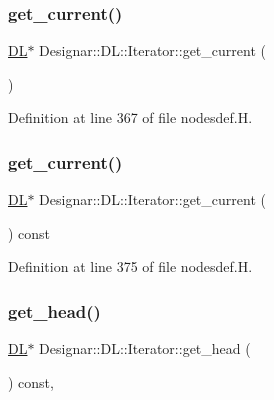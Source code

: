 \subsubsection{\texorpdfstring{get\+\_\+current()}{get\_current()}\hspace{0.1cm}{\footnotesize\ttfamily [1/2]}}
{\footnotesize\ttfamily \hyperlink{class_designar_1_1_d_l}{DL}$\ast$ Designar\+::\+D\+L\+::\+Iterator\+::get\+\_\+current (\begin{DoxyParamCaption}{ }\end{DoxyParamCaption})\hspace{0.3cm}{\ttfamily [inline]}}



Definition at line 367 of file nodesdef.\+H.

\mbox{\label{class_designar_1_1_d_l_1_1_iterator_aab4752b8c8f25cfbbd3560cebf23b7d1}} 
\subsubsection{\texorpdfstring{get\+\_\+current()}{get\_current()}\hspace{0.1cm}{\footnotesize\ttfamily [2/2]}}
{\footnotesize\ttfamily \hyperlink{class_designar_1_1_d_l}{DL}$\ast$ Designar\+::\+D\+L\+::\+Iterator\+::get\+\_\+current (\begin{DoxyParamCaption}{ }\end{DoxyParamCaption}) const\hspace{0.3cm}{\ttfamily [inline]}}



Definition at line 375 of file nodesdef.\+H.

\mbox{\label{class_designar_1_1_d_l_1_1_iterator_a575d5bbd0ce2e3d5df42d5d0112a1063}} 
\subsubsection{\texorpdfstring{get\+\_\+head()}{get\_head()}}
{\footnotesize\ttfamily \hyperlink{class_designar_1_1_d_l}{DL}$\ast$ Designar\+::\+D\+L\+::\+Iterator\+::get\+\_\+head (\begin{DoxyParamCaption}{ }\end{DoxyParamCaption}) const\hspace{0.3cm}{\ttfamily [inline]}, {\ttfamily [protected]}}




